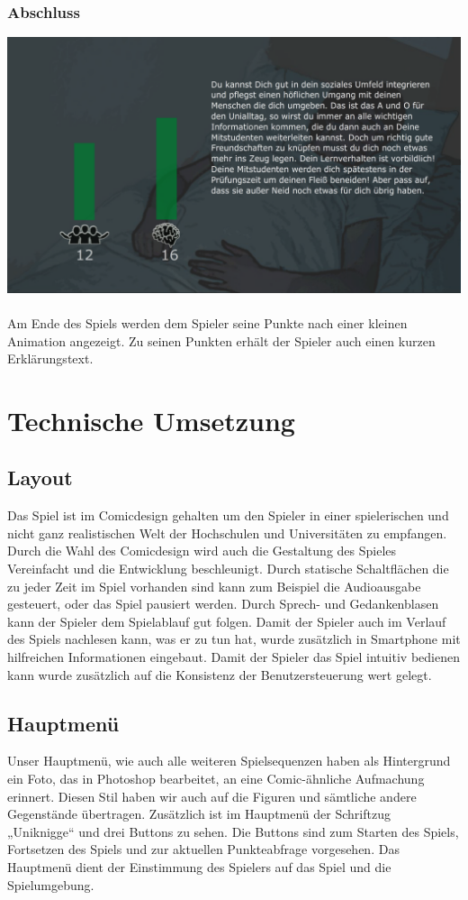 \documentclass[a4paper, 11pt]{article} %
\begin{document}
\subsubsection{Abschluss}
\includegraphics[scale=0.46]{images/spiel/outro.png}\\\\
Am Ende des Spiels werden dem Spieler seine Punkte nach einer kleinen Animation angezeigt. Zu seinen Punkten erhält der Spieler auch einen kurzen Erklärungstext.

\section{Technische Umsetzung}
\subsection{Layout}
Das Spiel ist im Comicdesign gehalten um den Spieler in einer spielerischen und nicht ganz realistischen Welt der Hochschulen und Universitäten zu empfangen. Durch die Wahl des Comicdesign wird auch die Gestaltung des Spieles Vereinfacht und die Entwicklung beschleunigt. Durch statische Schaltflächen die zu jeder Zeit im Spiel vorhanden sind kann zum Beispiel die Audioausgabe gesteuert, oder das Spiel pausiert werden. Durch Sprech- und Gedankenblasen kann der Spieler dem Spielablauf gut folgen. Damit der Spieler auch im Verlauf des Spiels nachlesen kann, was er zu tun hat, wurde zusätzlich in Smartphone mit hilfreichen Informationen eingebaut. Damit der Spieler das Spiel intuitiv bedienen kann wurde zusätzlich auf die Konsistenz der Benutzersteuerung wert gelegt.

\subsection{Hauptmenü}
Unser Hauptmenü, wie auch alle weiteren Spielsequenzen haben als Hintergrund ein Foto, das in Photoshop bearbeitet, an eine Comic-ähnliche Aufmachung erinnert. Diesen Stil haben wir auch auf die Figuren und sämtliche andere Gegenstände übertragen.
Zusätzlich ist im Hauptmenü der Schriftzug „Uniknigge“ und drei Buttons zu sehen. Die Buttons sind zum Starten des Spiels, Fortsetzen des Spiels und zur aktuellen Punkteabfrage vorgesehen. Das Hauptmenü dient der Einstimmung des Spielers auf das Spiel und die Spielumgebung.
\end{document}
